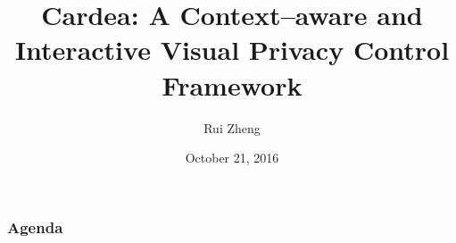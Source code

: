 \documentclass{beamer}
\title[Cardea]{Cardea: A Context--aware and Interactive Visual Privacy Control Framework}
\author{Rui Zheng}
\institute[HKUST] %
{
The Hong Kong University of Science and Technology \\ %
\medskip
rzhengac@connect.ust.hk %
}
\date{{\scriptsize October 21, 2016}}
\begin{document}
\begin{frame}
\titlepage
\end{frame}

\begin{frame}
\frametitle{Agenda}
\tableofcontents
\end{frame}











\end{document}
